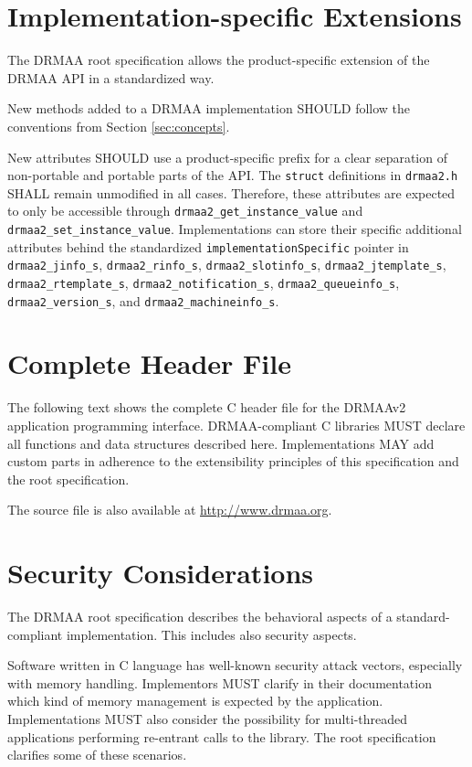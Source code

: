 \documentclass{article}
\newcommand{\h}[1]{\texttt{#1}}
\begin{document}
\section{Implementation-specific Extensions}
\label{sec:implspec}

The DRMAA root specification allows the product-specific extension of the DRMAA API in a standardized way.

New methods added to a DRMAA implementation SHOULD follow the conventions from Section \ref{sec:concepts}.

New attributes SHOULD use a product-specific prefix for a clear separation of non-portable and portable parts of the API. The \h{struct} definitions in \h{drmaa2.h} SHALL remain unmodified in all cases. Therefore, these attributes are expected to only be accessible through \h{drmaa2\_get\_instance\_value} and \h{drmaa2\_set\_instance\_value}. Implementations can store their specific additional attributes behind the standardized \h{implementationSpecific} pointer in \h{drmaa2\_jinfo\_s}, \h{drmaa2\_rinfo\_s}, \h{drmaa2\_slotinfo\_s}, \h{drmaa2\_jtemplate\_s}, \h{drmaa2\_rtemplate\_s}, \h{drmaa2\_notification\_s}, \h{drmaa2\_queueinfo\_s}, \h{drmaa2\_version\_s}, and \h{drmaa2\_machineinfo\_s}.

\section{Complete Header File}
\label{sec:idl}

The following text shows the complete C header file for the DRMAAv2 application programming interface. DRMAA-compliant C libraries MUST declare all functions and data structures described here. Implementations MAY add custom parts in adherence to the extensibility principles of this specification and the root specification.

The source file is also available at \url{http://www.drmaa.org}.



\section{Security Considerations}
\label{sec:security}

The DRMAA root specification \cite{gfd194}  describes the behavioral aspects of a standard-compliant implementation. This includes also security aspects.

Software written in C language has well-known security attack vectors, especially with memory handling. Implementors MUST clarify in their documentation which kind of memory management is expected by the application. Implementations MUST also consider the possibility for multi-threaded applications performing re-entrant calls to the library. The root specification clarifies some of these scenarios.
\end{document}
